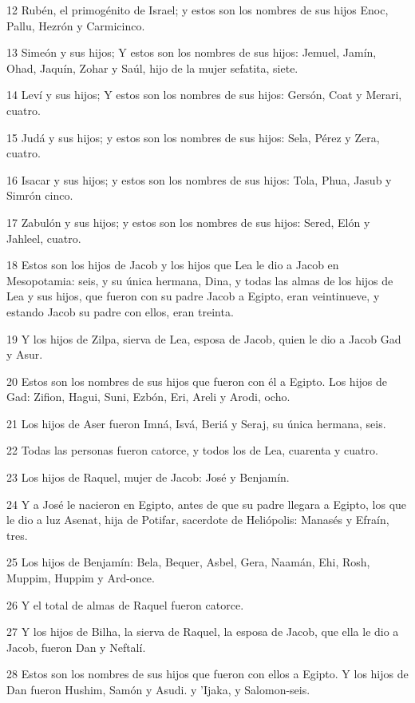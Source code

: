 \par 12 Rubén, el primogénito de Israel; y estos son los nombres de sus hijos Enoc, Pallu, Hezrón y Carmicinco.
\par 13 Simeón y sus hijos; Y estos son los nombres de sus hijos: Jemuel, Jamín, Ohad, Jaquín, Zohar y Saúl, hijo de la mujer sefatita, siete.
\par 14 Leví y sus hijos; Y estos son los nombres de sus hijos: Gersón, Coat y Merari, cuatro.
\par 15 Judá y sus hijos; y estos son los nombres de sus hijos: Sela, Pérez y Zera, cuatro.
\par 16 Isacar y sus hijos; y estos son los nombres de sus hijos: Tola, Phua, Jasub y Simrón cinco.
\par 17 Zabulón y sus hijos; y estos son los nombres de sus hijos: Sered, Elón y Jahleel, cuatro.
\par 18 Estos son los hijos de Jacob y los hijos que Lea le dio a Jacob en Mesopotamia: seis, y su única hermana, Dina, y todas las almas de los hijos de Lea y sus hijos, que fueron con su padre Jacob a Egipto, eran veintinueve, y estando Jacob su padre con ellos, eran treinta.
\par 19 Y los hijos de Zilpa, sierva de Lea, esposa de Jacob, quien le dio a Jacob Gad y Asur.
\par 20 Estos son los nombres de sus hijos que fueron con él a Egipto. Los hijos de Gad: Zifion, Hagui, Suni, Ezbón, Eri, Areli y Arodi, ocho.
\par 21 Los hijos de Aser fueron Imná, Isvá, Beriá y Seraj, su única hermana, seis.
\par 22 Todas las personas fueron catorce, y todos los de Lea, cuarenta y cuatro.
\par 23 Los hijos de Raquel, mujer de Jacob: José y Benjamín.
\par 24 Y a José le nacieron en Egipto, antes de que su padre llegara a Egipto, los que le dio a luz Asenat, hija de Potifar, sacerdote de Heliópolis: Manasés y Efraín, tres.
\par 25 Los hijos de Benjamín: Bela, Bequer, Asbel, Gera, Naamán, Ehi, Rosh, Muppim, Huppim y Ard-once.
\par 26 Y el total de almas de Raquel fueron catorce.
\par 27 Y los hijos de Bilha, la sierva de Raquel, la esposa de Jacob, que ella le dio a Jacob, fueron Dan y Neftalí.
\par 28 Estos son los nombres de sus hijos que fueron con ellos a Egipto. Y los hijos de Dan fueron Hushim, Samón y Asudi. y 'Ijaka, y Salomon-seis.
